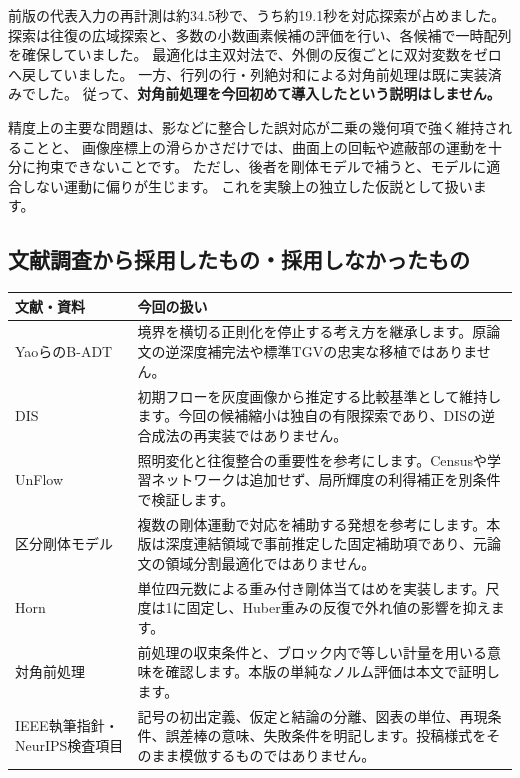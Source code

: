 \documentclass[a4paper,11pt]{ltjsarticle}
\theoremstyle{definition}
\begin{document}
前版の代表入力の再計測は約34.5秒で、うち約19.1秒を対応探索が占めました。
探索は往復の広域探索と、多数の小数画素候補の評価を行い、各候補で一時配列を確保していました。
最適化は主双対法で、外側の反復ごとに双対変数をゼロへ戻していました。
一方、行列の行・列絶対和による対角前処理は既に実装済みでした。
従って、\textbf{対角前処理を今回初めて導入したという説明はしません。}

精度上の主要な問題は、影などに整合した誤対応が二乗の幾何項で強く維持されることと、
画像座標上の滑らかさだけでは、曲面上の回転や遮蔽部の運動を十分に拘束できないことです。
ただし、後者を剛体モデルで補うと、モデルに適合しない運動に偏りが生じます。
これを実験上の独立した仮説として扱います。

\subsection{文献調査から採用したもの・採用しなかったもの}
\begingroup\small
\begin{longtable}{p{.26\linewidth}p{.66\linewidth}}
\toprule 文献・資料 & 今回の扱い\\\midrule\endhead
YaoらのB-ADT\cite{yao} & 境界を横切る正則化を停止する考え方を継承します。原論文の逆深度補完法や標準TGVの忠実な移植ではありません。\\
DIS\cite{dis} & 初期フローを灰度画像から推定する比較基準として維持します。今回の候補縮小は独自の有限探索であり、DISの逆合成法の再実装ではありません。\\
UnFlow\cite{unflow} & 照明変化と往復整合の重要性を参考にします。Censusや学習ネットワークは追加せず、局所輝度の利得補正を別条件で検証します。\\
区分剛体モデル\cite{vogel} & 複数の剛体運動で対応を補助する発想を参考にします。本版は深度連結領域で事前推定した固定補助項であり、元論文の領域分割最適化ではありません。\\
Horn\cite{horn} & 単位四元数による重み付き剛体当てはめを実装します。尺度は1に固定し、Huber重みの反復で外れ値の影響を抑えます。\\
対角前処理\cite{pock,naganuma} & 前処理の収束条件と、ブロック内で等しい計量を用いる意味を確認します。本版の単純なノルム評価は本文で証明します。\\
IEEE執筆指針・NeurIPS検査項目\cite{ieee,checklist} & 記号の初出定義、仮定と結論の分離、図表の単位、再現条件、誤差棒の意味、失敗条件を明記します。投稿様式をそのまま模倣するものではありません。\\\bottomrule
\end{longtable}
\endgroup
\end{document}
